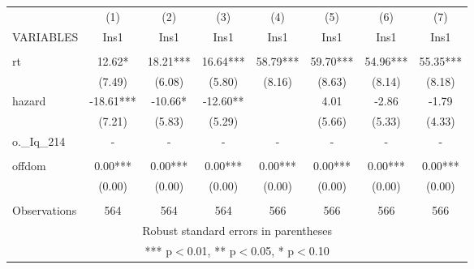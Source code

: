 \documentclass[]{article}
\begin{document}
\begin{tabular}{lccccccc} \hline
 & (1) & (2) & (3) & (4) & (5) & (6) & (7) \\
VARIABLES & Ins1 & Ins1 & Ins1 & Ins1 & Ins1 & Ins1 & Ins1 \\ \hline
 &  &  &  &  &  &  &  \\
rt & 12.62* & 18.21*** & 16.64*** & 58.79*** & 59.70*** & 54.96*** & 55.35*** \\
 & (7.49) & (6.08) & (5.80) & (8.16) & (8.63) & (8.14) & (8.18) \\
hazard & -18.61*** & -10.66* & -12.60** &  & 4.01 & -2.86 & -1.79 \\
 & (7.21) & (5.83) & (5.29) &  & (5.66) & (5.33) & (4.33) \\
o.\_Iq\_214 & - & - & - & - & - & - & - \\
 &  &  &  &  &  &  &  \\
offdom & 0.00*** & 0.00*** & 0.00*** & 0.00*** & 0.00*** & 0.00*** & 0.00*** \\
 & (0.00) & (0.00) & (0.00) & (0.00) & (0.00) & (0.00) & (0.00) \\
 &  &  &  &  &  &  &  \\
 Observations & 564 & 564 & 564 & 566 & 566 & 566 & 566 \\ \hline
\multicolumn{8}{c}{ Robust standard errors in parentheses} \\
\multicolumn{8}{c}{ *** p$<$0.01, ** p$<$0.05, * p$<$0.10} \\
\end{tabular}
\end{document}
